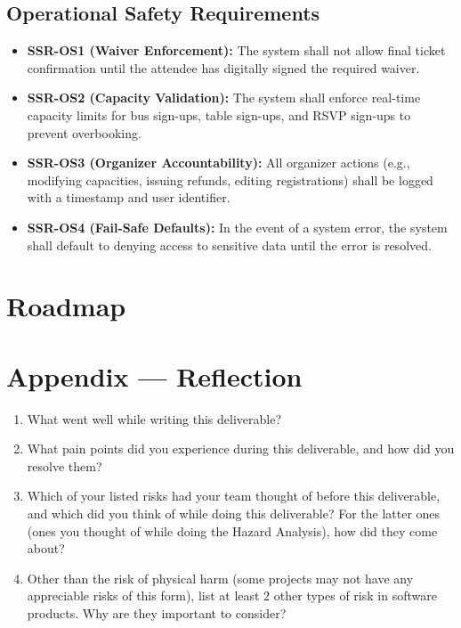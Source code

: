 \documentclass{article}
\begin{document}
\subsection{Operational Safety Requirements}
\begin{itemize}
    \item \textbf{SSR-OS1 (Waiver Enforcement):} The system shall not allow final ticket confirmation until the attendee has digitally signed the required waiver.
    \item \textbf{SSR-OS2 (Capacity Validation):} The system shall enforce real-time capacity limits for bus sign-ups, table sign-ups, and RSVP sign-ups to prevent overbooking.
    \item \textbf{SSR-OS3 (Organizer Accountability):} All organizer actions (e.g., modifying capacities, issuing refunds, editing registrations) shall be logged with a timestamp and user identifier.
    \item \textbf{SSR-OS4 (Fail-Safe Defaults):} In the event of a system error, the system shall default to denying access to sensitive data until the error is resolved.
\end{itemize}


\section{Roadmap}


\newpage{}

\section*{Appendix --- Reflection}




\begin{enumerate}
    \item What went well while writing this deliverable? 
    \item What pain points did you experience during this deliverable, and how
    did you resolve them?
    \item Which of your listed risks had your team thought of before this
    deliverable, and which did you think of while doing this deliverable? For
    the latter ones (ones you thought of while doing the Hazard Analysis), how
    did they come about?
    \item Other than the risk of physical harm (some projects may not have any
    appreciable risks of this form), list at least 2 other types of risk in
    software products. Why are they important to consider?
\end{enumerate}
\end{document}
